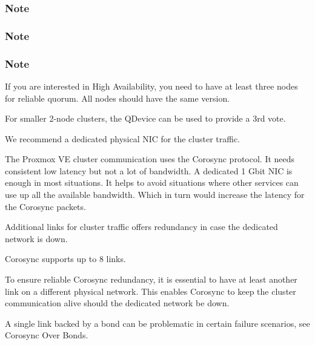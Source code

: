 \subsubsection{Note}

\subsubsection{Note}

\subsubsection{Note}

If you are interested in High Availability, you need to have at least three nodes for reliable quorum. All nodes should have the same version.

For smaller 2-node clusters, the QDevice can be used to provide a 3rd vote.

We recommend a dedicated physical NIC for the cluster traffic.

The Proxmox VE cluster communication uses the Corosync protocol. It needs consistent low latency but not a lot of bandwidth. A dedicated 1 Gbit NIC is enough in most situations. It helps to avoid situations where other services can use up all the available bandwidth. Which in turn would increase the latency for the Corosync packets.

Additional links for cluster traffic offers redundancy in case the dedicated network is down.

Corosync supports up to 8 links.

To ensure reliable Corosync redundancy, it is essential to have at least another link on a different physical network. This enables Corosync to keep the cluster communication alive should the dedicated network be down.

A single link backed by a bond can be problematic in certain failure scenarios, see Corosync Over Bonds.

